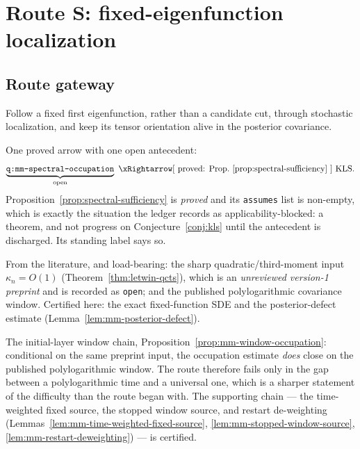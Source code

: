 \documentclass[../../main.tex]{subfiles}
\begin{document}
\section{Route S: fixed-eigenfunction localization}
\label{sec:spectral-route}

\subsection*{Route gateway}

\begin{description}[leftmargin=0pt,style=nextline,itemsep=0.3em]
  \item[1. Thesis.] Follow a fixed first eigenfunction, rather than a candidate cut, through
  stochastic localization, and keep its tensor orientation alive in the posterior covariance.

  \item[2. Bridge to KLS.] One proved arrow with one open antecedent:
  \[
    \underbrace{\texttt{q:mm-spectral-occupation}}_{\text{open}}
    \ \xRightarrow[\ \text{proved: Prop.~\ref{prop:spectral-sufficiency}}\ ]{}\
    \text{KLS}.
  \]
  Proposition~\ref{prop:spectral-sufficiency} is \emph{proved} and its
  \texttt{assumes} list is non-empty, which is exactly the situation the ledger records as
  applicability-blocked: a theorem, and not progress on Conjecture~\ref{conj:kls} until the
  antecedent is discharged. Its standing label says so.

  \item[3. Established inputs.] From the literature, and load-bearing: the sharp
  quadratic/third-moment input $\kappa_n=O(1)$ (Theorem~\ref{thm:letwin-qcts}), which is an
  \emph{unreviewed version-1 preprint} and is recorded as \texttt{open}; and the published
  polylogarithmic covariance window. Certified here: the exact fixed-function SDE and the
  posterior-defect estimate (Lemma~\ref{lem:mm-posterior-defect}).

  \item[4. Main advance so far.] The initial-layer window chain,
  Proposition~\ref{prop:mm-window-occupation}: conditional on the same preprint input, the
  occupation estimate \emph{does} close on the published polylogarithmic window. The route
  therefore fails only in the gap between a polylogarithmic time and a universal one, which is
  a sharper statement of the difficulty than the route began with. The supporting chain ---
  the time-weighted fixed source, the stopped window source, and restart de-weighting
  (Lemmas~\ref{lem:mm-time-weighted-fixed-source}, \ref{lem:mm-stopped-window-source},
  \ref{lem:mm-restart-deweighting}) --- is certified.


\end{description}
\end{document}
